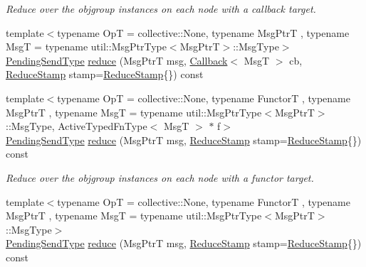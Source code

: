 \begin{DoxyCompactItemize}
\begin{DoxyCompactList}\small\item\em Reduce over the objgroup instances on each node with a callback target. \end{DoxyCompactList}\item 
{\footnotesize template$<$typename OpT  = collective\+::\+None, typename Msg\+PtrT , typename MsgT  = typename util\+::\+Msg\+Ptr\+Type$<$\+Msg\+Ptr\+T$>$\+::\+Msg\+Type$>$ }\\\hyperlink{structvt_1_1objgroup_1_1proxy_1_1_proxy_a1bdf8713203531d306702a024872bb08}{Pending\+Send\+Type} \hyperlink{structvt_1_1objgroup_1_1proxy_1_1_proxy_adf7063db97ee8f694b5a677abd2f8543}{reduce} (Msg\+PtrT msg, \hyperlink{namespacevt_a57b238783d05de96bc2c4027f7073b7f}{Callback}$<$ MsgT $>$ cb, \hyperlink{structvt_1_1objgroup_1_1proxy_1_1_proxy_a337be4c20cf11ff6477c7a66208cc909}{Reduce\+Stamp} stamp=\hyperlink{structvt_1_1objgroup_1_1proxy_1_1_proxy_a337be4c20cf11ff6477c7a66208cc909}{Reduce\+Stamp}\{\}) const
\item 
{\footnotesize template$<$typename OpT  = collective\+::\+None, typename FunctorT , typename Msg\+PtrT , typename MsgT  = typename util\+::\+Msg\+Ptr\+Type$<$\+Msg\+Ptr\+T$>$\+::\+Msg\+Type, Active\+Typed\+Fn\+Type$<$ Msg\+T $>$ $\ast$ f$>$ }\\\hyperlink{structvt_1_1objgroup_1_1proxy_1_1_proxy_a1bdf8713203531d306702a024872bb08}{Pending\+Send\+Type} \hyperlink{structvt_1_1objgroup_1_1proxy_1_1_proxy_a55fdba093739d439d22076815e1ad424}{reduce} (Msg\+PtrT msg, \hyperlink{structvt_1_1objgroup_1_1proxy_1_1_proxy_a337be4c20cf11ff6477c7a66208cc909}{Reduce\+Stamp} stamp=\hyperlink{structvt_1_1objgroup_1_1proxy_1_1_proxy_a337be4c20cf11ff6477c7a66208cc909}{Reduce\+Stamp}\{\}) const
\begin{DoxyCompactList}\small\item\em Reduce over the objgroup instances on each node with a functor target. \end{DoxyCompactList}\item 
{\footnotesize template$<$typename OpT  = collective\+::\+None, typename FunctorT , typename Msg\+PtrT , typename MsgT  = typename util\+::\+Msg\+Ptr\+Type$<$\+Msg\+Ptr\+T$>$\+::\+Msg\+Type$>$ }\\\hyperlink{structvt_1_1objgroup_1_1proxy_1_1_proxy_a1bdf8713203531d306702a024872bb08}{Pending\+Send\+Type} \hyperlink{structvt_1_1objgroup_1_1proxy_1_1_proxy_a212f464e2e25a7c89db2553362e9728c}{reduce} (Msg\+PtrT msg, \hyperlink{structvt_1_1objgroup_1_1proxy_1_1_proxy_a337be4c20cf11ff6477c7a66208cc909}{Reduce\+Stamp} stamp=\hyperlink{structvt_1_1objgroup_1_1proxy_1_1_proxy_a337be4c20cf11ff6477c7a66208cc909}{Reduce\+Stamp}\{\}) const

\end{DoxyCompactItemize}
